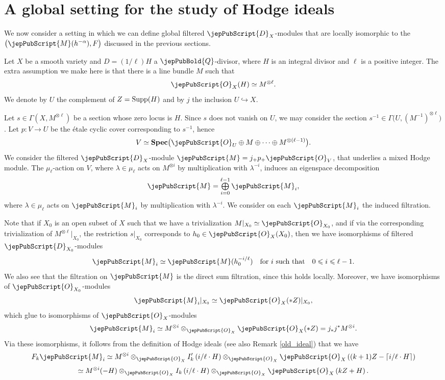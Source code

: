 \section{A global setting for the study of Hodge ideals}\label{global_setting}
We now consider a setting in which we can define global filtered $\jepPubScript{D}_X$-modules that are locally isomorphic to the
$\big(\jepPubScript{M}(h^{-\alpha}), F\big)$ discussed in the previous sections. 

Let $X$ be a smooth variety and $D=(1/\ell)H$ a $\jepPubBold{Q}$-divisor, where $H$ is an integral divisor and $\ell$ is a positive integer.
The extra assumption we make here is that there is a line bundle $M$ such that 
$$\jepPubScript{O}_X(H)\simeq M^{\otimes \ell}.$$ 
We denote by $U$ the complement of $Z={\rm Supp}(H)$
and by $j$ the inclusion $U\hookrightarrow X$.

Let $s\in \Gamma(X,M^{\otimes \ell})$ be a section whose zero locus is $H$. 
Since $s$ does not vanish on $U$, we may consider the section $s^{-1}\in\Gamma\big(U,(M^{-1})^{\otimes \ell}\big)$. Let $p\colon V\to U$ be the \'{e}tale cyclic cover corresponding 
to $s^{-1}$, hence
$$V\simeq {\bf Spec}\big(\jepPubScript{O}_U\oplus M\oplus\cdots\oplus M^{\otimes(\ell-1)}\big).$$
We consider the filtered $\jepPubScript{D}_X$-module $\jepPubScript{M}=j_+p_+\jepPubScript{O}_V$, that underlies
a mixed Hodge module. The  $\mu_{\ell}$-action on $V$, where $\lambda\in\mu_{\ell}$ acts on $M^{\otimes i}$ by multiplication with
$\lambda^{-i}$,
induces an eigenspace decomposition
$$\jepPubScript{M}=\mathop{\textstyle\bigoplus}\limits_{i=0}^{\ell-1}\jepPubScript{M}_i,$$
where $\lambda\in\mu_{\ell}$ acts on $\jepPubScript{M}_i$ by multiplication with $\lambda^{-i}$.
We consider on each $\jepPubScript{M}_i$ the induced filtration.

Note that if $X_0$ is an open subset of $X$ such that we have a trivialization $M\vert_{X_0}\simeq\jepPubScript{O}_{X_0}$, and if 
via the corresponding trivialization of $M^{\otimes \ell}\vert_{X_0}$, the restriction $s\vert_{X_0}$ corresponds to $h_0\in\jepPubScript{O}_X(X_0)$, then 
we have isomorphisms of filtered $\jepPubScript{D}_{X_0}$-modules
$$\jepPubScript{M}_i\simeq\jepPubScript{M}(h_0^{-i/\ell})\quad\text{for $i$ such that}\quad 0\leqslant i\leqslant \ell-1.$$
We also see that the filtration on $\jepPubScript{M}$ is the direct sum filtration, since this holds locally. 
Moreover, we have isomorphisms of $\jepPubScript{O}_{X_0}$-modules
$$\jepPubScript{M}_i\vert_{X_0}\simeq\jepPubScript{O}_X(*Z)\vert_{X_0},$$
which glue to isomorphisms of $\jepPubScript{O}_X$-modules
$$\jepPubScript{M}_i\simeq M^{\otimes i}\otimes_{\jepPubScript{O}_X}\jepPubScript{O}_X(*Z)=j_*j^*M^{\otimes i}.$$
Via these isomorphisms, it follows from the definition of Hodge ideals (see also Remark \ref{old_ideal}) that we have
$$F_k\jepPubScript{M}_i\simeq M^{\otimes i}\otimes_{\jepPubScript{O}_X}I_k^\prime \left(i/\ell \cdot H\right)\otimes_{\jepPubScript{O}_X}\jepPubScript{O}_X\left((k+1)Z-\lceil i/\ell \cdot H\rceil\right)
$$ 
$$\simeq M^{\otimes i} (-H) \otimes_{\jepPubScript{O}_X}I_k\left(i/\ell \cdot H\right)\otimes_{\jepPubScript{O}_X}\jepPubScript{O}_X\left(kZ+ H\right).$$



